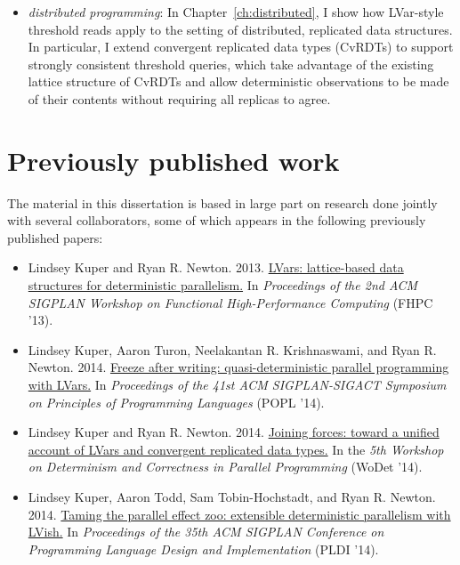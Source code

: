\begin{itemize}
  \item \emph{distributed programming}: In
    Chapter~\ref{ch:distributed}, I show how LVar-style threshold
    reads apply to the setting of distributed, replicated data
    structures.  In particular, I extend convergent replicated data
    types (CvRDTs) to support strongly consistent threshold queries,
    which take advantage of the existing lattice structure of CvRDTs
    and allow deterministic observations to be made of their contents
    without requiring all replicas to agree.
\end{itemize}
\fi

\section{Previously published work}

\ifdefined\DISSERTATION
The material in this dissertation is based in large part on research
done jointly with several collaborators, some of which appears in the
following previously published papers:

\begin{itemize}
\item Lindsey Kuper and Ryan
  R. Newton. 2013. \href{http://doi.acm.org/10.1145/2502323.2502326}{LVars:
    lattice-based data structures for deterministic parallelism.} In
  \emph{Proceedings of the 2nd ACM SIGPLAN Workshop on Functional
    High-Performance Computing} (FHPC '13).

\item Lindsey Kuper, Aaron Turon, Neelakantan R. Krishnaswami, and
  Ryan
  R. Newton. 2014. \href{http://doi.acm.org/10.1145/2535838.2535842
  }{Freeze after writing: quasi-deterministic parallel programming
    with LVars.} In \emph{Proceedings of the 41st ACM SIGPLAN-SIGACT
    Symposium on Principles of Programming Languages} (POPL '14).

\item Lindsey Kuper and Ryan
  R. Newton. 2014. \href{http://wodet.cs.washington.edu/wp-content/uploads/2014/02/wodet2014-final1.pdf}{Joining
    forces: toward a unified account of LVars and convergent
    replicated data types.} In the \emph{5th Workshop on Determinism
    and Correctness in Parallel Programming} (WoDet '14).

\item Lindsey Kuper, Aaron Todd, Sam Tobin-Hochstadt, and Ryan
  R. Newton. 2014. \href{http://doi.acm.org/10.1145/2594291.2594312
  }{Taming the parallel effect zoo: extensible deterministic
    parallelism with LVish.} In \emph{Proceedings of the 35th ACM
    SIGPLAN Conference on Programming Language Design and
    Implementation} (PLDI '14).
\end{itemize}

